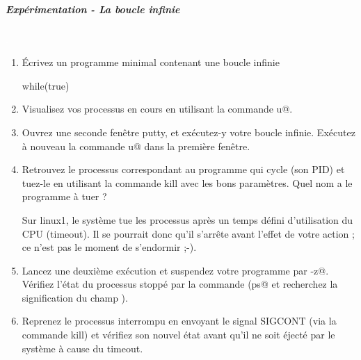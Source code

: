 \documentclass[11pt,a4paper]{article}
\begin{document}
            \par
        
			
		\subparagraph{Exp\'erimentation - La boucle infinie} 
		
					\textcolor{white}{.} \par
				
            \par
        
					\begin{enumerate}
				
			\item 
						\'Ecrivez un programme minimal 
						contenant une boucle infinie
						\begin{Java}
	while(true){}
						\end{Java}
			\item 
						Visualisez vos processus en cours en utilisant la commande 
						\verb@ps u@.
					
			\item 
						Ouvrez une seconde fen\^etre putty, et ex\'ecutez-y 
						votre boucle infinie.
						Ex\'ecutez \`a nouveau la commande 
						\verb@ps u@
						dans la premi\`ere fen\^etre.
					
			\item 
						Retrouvez le processus correspondant au programme 
						qui cycle (son PID)
						et tuez-le en utilisant la commande kill
						avec les bons param\`etres. Quel nom a le programme \`a tuer ?
						
            \par
        
						Sur linux1,
						le syst\`eme tue les processus apr\`es un temps d\'efini
						d'utilisation du CPU (timeout). Il se pourrait donc
						qu'il s'arr\^ete avant l'effet de votre action ;
						ce n'est pas le moment de s'endormir ;-).
						
            \par
        
			\item 
						Lancez une deuxi\`eme ex\'ecution et suspendez votre programme 
						par \verb@Ctrl-z@.
						V\'erifiez l'\'etat du processus stopp\'e par la commande 
						\verb@ps@
						(\verb@man ps@ et recherchez 
						la signification du champ 
						\verb@STAT@).
					
			\item 
						Reprenez le processus interrompu en envoyant le signal 
						SIGCONT (via la commande kill) 
						et v\'erifiez son nouvel \'etat avant qu'il ne soit \'eject\'e par 
						le syst\`eme \`a cause du \guillemotleft timeout\guillemotright .
					

\end{enumerate}
\end{document}
